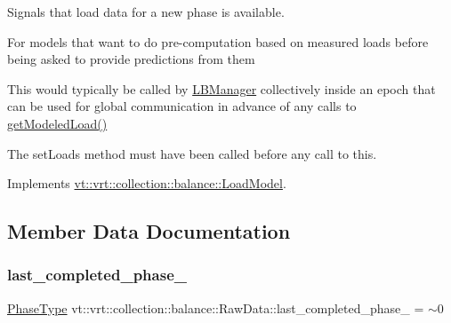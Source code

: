 Signals that load data for a new phase is available. 

For models that want to do pre-\/computation based on measured loads before being asked to provide predictions from them

This would typically be called by \hyperlink{structvt_1_1vrt_1_1collection_1_1balance_1_1_l_b_manager}{L\+B\+Manager} collectively inside an epoch that can be used for global communication in advance of any calls to \hyperlink{structvt_1_1vrt_1_1collection_1_1balance_1_1_raw_data_adc3d74f514051c2b0dad8ba9b65e2d1a}{get\+Modeled\+Load()}

The {\ttfamily set\+Loads} method must have been called before any call to this. 

Implements \hyperlink{structvt_1_1vrt_1_1collection_1_1balance_1_1_load_model_a4f1c6fb5d7d7a0b147755f025b1d5f5c}{vt\+::vrt\+::collection\+::balance\+::\+Load\+Model}.



\subsection{Member Data Documentation}
\mbox{\label{structvt_1_1vrt_1_1collection_1_1balance_1_1_raw_data_a9ceb9cf1dd88772821658e506d015397}} 
\subsubsection{\texorpdfstring{last\+\_\+completed\+\_\+phase\+\_\+}{last\_completed\_phase\_}}
{\footnotesize\ttfamily \hyperlink{namespacevt_a46ce6733d5cdbd735d561b7b4029f6d7}{Phase\+Type} vt\+::vrt\+::collection\+::balance\+::\+Raw\+Data\+::last\+\_\+completed\+\_\+phase\+\_\+ = $\sim$0}

\mbox{\label{structvt_1_1vrt_1_1collection_1_1balance_1_1_raw_data_a1e350ebf1bd9b3c94fdbc371779b8832}} 
